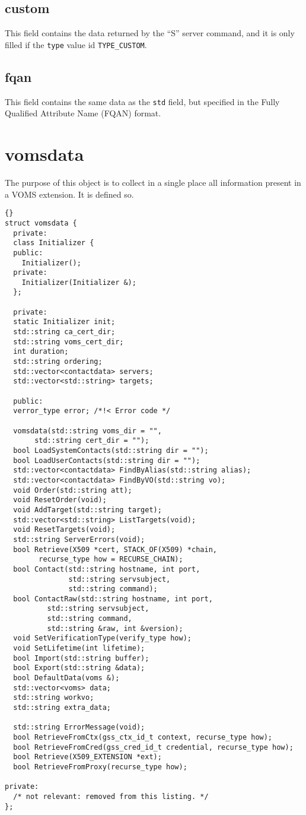 \documentclass[a4paper]{book}
\begin{document}
\subsection{custom}
This field contains the data returned by the ``S'' server command, and
it is only filled if the \texttt{type} value id \texttt{TYPE\_CUSTOM}.

\subsection{fqan}
This field contains the same data as the \texttt{std} field, but
specified in the Fully Qualified Attribute Name (FQAN) format.

\section{vomsdata}
The purpose of this object is to collect in a single place all
information present in a VOMS extension. It is defined so.

\begin{lstlisting}{}
struct vomsdata {
  private:
  class Initializer {
  public:
    Initializer();
  private:
    Initializer(Initializer &);
  };

  private:
  static Initializer init;
  std::string ca_cert_dir;
  std::string voms_cert_dir;
  int duration;
  std::string ordering;
  std::vector<contactdata> servers;
  std::vector<std::string> targets;

  public:
  verror_type error; /*!< Error code */

  vomsdata(std::string voms_dir = "", 
	   std::string cert_dir = "");
  bool LoadSystemContacts(std::string dir = "");
  bool LoadUserContacts(std::string dir = "");
  std::vector<contactdata> FindByAlias(std::string alias);
  std::vector<contactdata> FindByVO(std::string vo);
  void Order(std::string att);
  void ResetOrder(void);
  void AddTarget(std::string target);
  std::vector<std::string> ListTargets(void);
  void ResetTargets(void);
  std::string ServerErrors(void);
  bool Retrieve(X509 *cert, STACK_OF(X509) *chain, 
		recurse_type how = RECURSE_CHAIN);
  bool Contact(std::string hostname, int port, 
               std::string servsubject, 
               std::string command);
  bool ContactRaw(std::string hostname, int port, 
		  std::string servsubject, 
		  std::string command,
		  std::string &raw, int &version);
  void SetVerificationType(verify_type how);
  void SetLifetime(int lifetime);
  bool Import(std::string buffer);
  bool Export(std::string &data);
  bool DefaultData(voms &);
  std::vector<voms> data;
  std::string workvo;
  std::string extra_data;

  std::string ErrorMessage(void);
  bool RetrieveFromCtx(gss_ctx_id_t context, recurse_type how);
  bool RetrieveFromCred(gss_cred_id_t credential, recurse_type how);
  bool Retrieve(X509_EXTENSION *ext);
  bool RetrieveFromProxy(recurse_type how);

private:
  /* not relevant: removed from this listing. */
};
\end{lstlisting}
\end{document}
